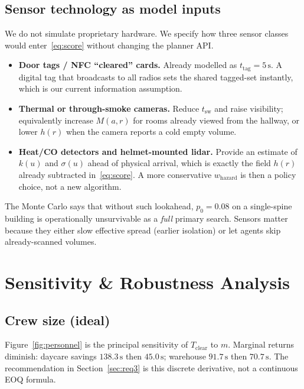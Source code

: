 \documentclass[12pt]{article}
\newcommand{\Tclear}{T_{\mathrm{clear}}}
\newcommand{\tsw}{t_{\mathrm{sw}}}
\newcommand{\ttag}{t_{\mathrm{tag}}}
\begin{document}
\subsection{Sensor technology as model inputs}

We do not simulate proprietary hardware. We specify how three sensor classes would
enter~\eqref{eq:score} without changing the planner API.
\begin{itemize}[leftmargin=1.2em]
  \item \textbf{Door tags / NFC ``cleared'' cards.}
        Already modelled as \(\ttag=5\,\mathrm{s}\). A digital tag that broadcasts
        to all radios sets the shared tagged-set instantly, which is our current
        information assumption.
  \item \textbf{Thermal or through-smoke cameras.}
        Reduce \(\tsw\) and raise visibility; equivalently increase \(M(a,r)\) for
        rooms already viewed from the hallway, or lower \(h(r)\) when the camera
        reports a cold empty volume.
  \item \textbf{Heat/CO detectors and helmet-mounted lidar.}
        Provide an estimate of \(k(u)\) and \(\sigma(u)\) ahead of physical arrival,
        which is exactly the field \(h(r)\) already subtracted in~\eqref{eq:score}.
        A more conservative \(w_{\mathrm{hazard}}\) is then a policy choice, not a
        new algorithm.
\end{itemize}
The Monte Carlo says that without such lookahead, \(p_0=0.08\) on a single-spine
building is operationally unsurvivable as a \emph{full} primary search. Sensors
matter because they either slow effective spread (earlier isolation) or let agents
skip already-scanned volumes.

\section{Sensitivity \& Robustness Analysis}
\label{sec:req5}

\subsection{Crew size (ideal)}

Figure~\ref{fig:personnel} is the principal sensitivity of \(\Tclear\) to \(m\).
Marginal returns diminish: daycare savings \(138.3\,\mathrm{s}\) then
\(45.0\,\mathrm{s}\); warehouse \(91.7\,\mathrm{s}\) then \(70.7\,\mathrm{s}\).
The recommendation in Section~\ref{sec:req3} is this discrete derivative, not a
continuous EOQ formula.
\end{document}
